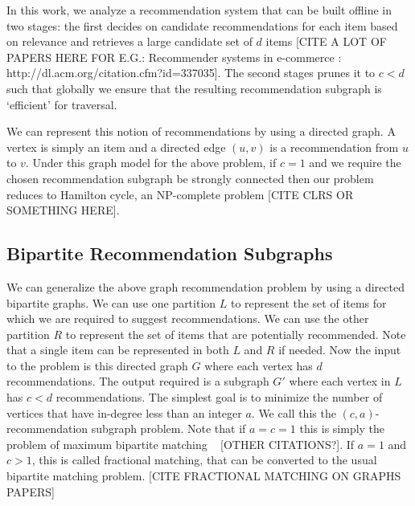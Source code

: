 
In this work, we analyze a recommendation system that can be built
offline in two stages: the first decides on candidate recommendations
for each item based on relevance and retrieves a large candidate set
of $d$ items [CITE A LOT OF PAPERS HERE FOR E.G.: Recommender systems
  in e-commerce : http://dl.acm.org/citation.cfm?id=337035].  The
second stages prunes it to $c < d$ such that globally we ensure that
the resulting recommendation subgraph is `efficient' for traversal. 


We can represent this notion of recommendations by using a directed graph. A
vertex is simply an item and a directed edge $(u, v)$ is a recommendation from
$u$ to $v$. Under this graph model for the above problem, if $c=1$ and we
require the chosen recommendation subgraph be strongly connected then our
problem reduces to Hamilton cycle, an NP-complete problem [CITE CLRS
OR SOMETHING HERE]. \vs

\subsection{Bipartite Recommendation Subgraphs}

We can generalize the above graph recommendation problem by using a
directed bipartite graphs. We can use one partition $L$ to represent
the set of items for which we are required to suggest
recommendations. We can use the other partition $R$ to represent the
set of items that are potentially recommended. Note that a single item
can be represented in both $L$ and $R$ if needed.  Now the input to
the problem is this directed graph $G$ where each vertex has $d$
recommendations. The output required is a subgraph $G'$ where each
vertex in $L$ has $c < d$ recommendations. The simplest goal is to
minimize the number of vertices that have in-degree less than an
integer $a$. We call this the $(c, a)$-recommendation subgraph
problem.  Note that if $a=c=1$ this is simply the problem of maximum
bipartite matching ~\cite{LovaszPlummer} [OTHER CITATIONS?]. If $a=1$
and $c > 1$, this is called fractional matching, that can be converted
to the usual bipartite matching problem. [CITE FRACTIONAL MATCHING ON
  GRAPHS PAPERS]\vs

